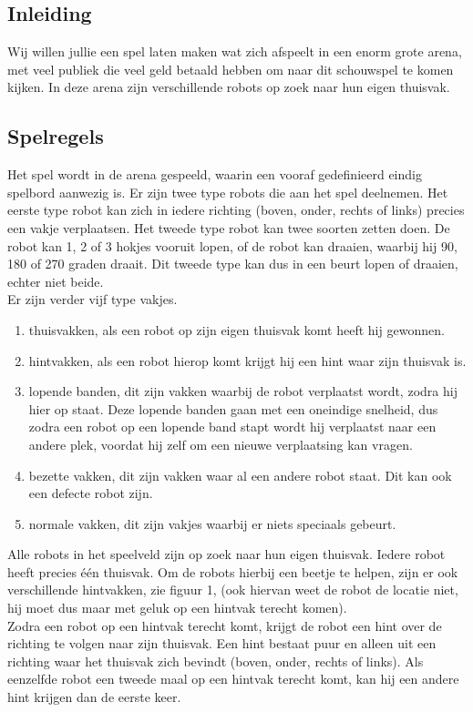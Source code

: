 
\subsection{Inleiding}

Wij willen jullie een spel laten maken wat zich afspeelt in een enorm grote arena, met veel publiek die veel geld betaald hebben om naar dit schouwspel te komen kijken. In deze arena zijn verschillende robots op zoek naar hun eigen thuisvak.

\subsection{Spelregels}

Het spel wordt in de arena gespeeld, waarin een vooraf gedefinieerd eindig spelbord aanwezig is.
Er zijn twee type robots die aan het spel deelnemen. Het eerste type robot kan zich in iedere richting (boven, onder, rechts of links) precies een vakje verplaatsen. Het tweede type robot kan twee soorten zetten doen. De robot kan 1, 2 of 3 hokjes vooruit lopen, of de robot kan draaien, waarbij hij 90, 180 of 270 graden draait. Dit tweede type kan dus in een beurt lopen of draaien, echter niet beide.\\
Er zijn verder vijf type vakjes.
\begin{enumerate}
  \item thuisvakken, als een robot op zijn eigen thuisvak komt heeft hij gewonnen.
  \item hintvakken, als een robot hierop komt krijgt hij een hint waar zijn thuisvak is.
  \item lopende banden, dit zijn vakken waarbij de robot verplaatst wordt, zodra hij hier op staat. Deze lopende banden gaan met een oneindige snelheid, dus zodra een robot op een lopende band stapt wordt hij verplaatst naar een andere plek, voordat hij zelf om een nieuwe verplaatsing kan vragen.
  \item bezette vakken, dit zijn vakken waar al een andere robot staat. Dit kan ook een defecte robot zijn.
  \item normale vakken, dit zijn vakjes waarbij er niets speciaals gebeurt.
\end{enumerate}

\noindent Alle robots in het speelveld zijn op zoek naar hun eigen thuisvak. Iedere robot heeft precies \'{e}\'{e}n thuisvak. Om de robots hierbij een beetje te helpen, zijn er ook verschillende hintvakken, zie figuur 1, (ook hiervan weet de robot de locatie niet, hij moet dus maar met geluk op een hintvak terecht komen).\\
Zodra een robot op een hintvak terecht komt, krijgt de robot een hint over de richting te volgen naar zijn thuisvak. Een hint bestaat puur en alleen uit een richting waar het thuisvak zich bevindt (boven, onder, rechts of links). Als eenzelfde robot een tweede maal op een hintvak terecht komt, kan hij een andere hint krijgen dan de eerste keer.


